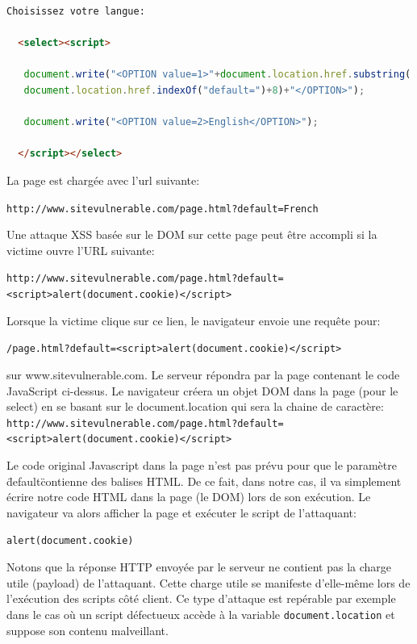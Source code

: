 \documentclass[a4paper,12pt]{report}
\begin{document}
  \begin{lstlisting}[float=htb, language=html, frame=lines, caption={Code initial}, label={code:modelUser}]
  Choisissez votre langue:

  <select><script>

   document.write("<OPTION value=1>"+document.location.href.substring(
   document.location.href.indexOf("default=")+8)+"</OPTION>");

   document.write("<OPTION value=2>English</OPTION>");

  </script></select>
  \end{lstlisting}


  La page est chargée avec l'url suivante:

  \lstinline{http://www.sitevulnerable.com/page.html?default=French}

  Une attaque XSS basée sur le DOM sur cette page peut être accompli si la victime ouvre l'URL suivante:

  \lstinline{http://www.sitevulnerable.com/page.html?default=<script>alert(document.cookie)</script>}

  Lorsque la victime clique sur ce lien, le navigateur envoie une requête pour:

  \lstinline{/page.html?default=<script>alert(document.cookie)</script>}

  sur www.sitevulnerable.com. Le serveur répondra par la page contenant le code JavaScript ci-dessus. Le navigateur créera un objet DOM dans la page (pour le select) en se basant sur le document.location qui sera la chaine de caractère:
  \lstinline{http://www.sitevulnerable.com/page.html?default=<script>alert(document.cookie)</script>}

  Le code original Javascript dans la page n'est pas prévu pour que le paramètre \"default\" contienne des balises HTML. De ce fait, dans notre cas, il va simplement écrire notre code HTML dans la page (le DOM) lors de son exécution. Le navigateur va alors afficher la page et exécuter le script de l'attaquant:

  \lstinline{alert(document.cookie)}

  Notons que la réponse HTTP envoyée par le serveur ne contient pas la charge utile (payload) de l'attaquant. Cette charge utile se manifeste d'elle-même lors de l'exécution des scripts côté client. Ce type d'attaque est repérable par exemple dans le cas où un script défectueux accède à la variable \lstinline{document.location} et suppose son contenu malveillant.
\end{document}
